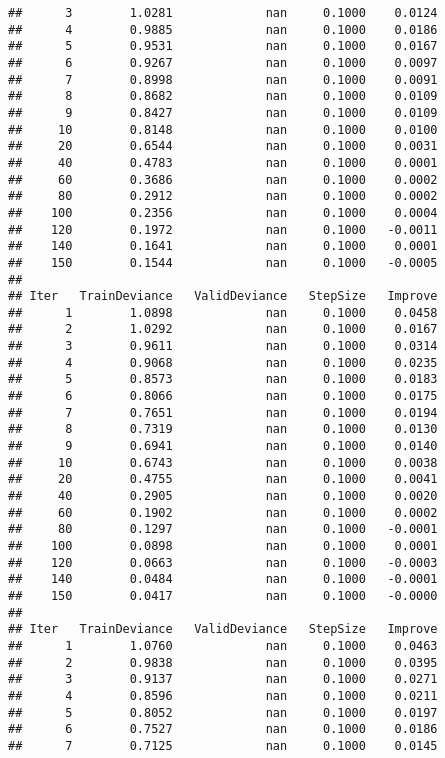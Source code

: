 \documentclass[]{article}
\begin{document}
\begin{verbatim}
##      3        1.0281             nan     0.1000    0.0124
##      4        0.9885             nan     0.1000    0.0186
##      5        0.9531             nan     0.1000    0.0167
##      6        0.9267             nan     0.1000    0.0097
##      7        0.8998             nan     0.1000    0.0091
##      8        0.8682             nan     0.1000    0.0109
##      9        0.8427             nan     0.1000    0.0109
##     10        0.8148             nan     0.1000    0.0100
##     20        0.6544             nan     0.1000    0.0031
##     40        0.4783             nan     0.1000    0.0001
##     60        0.3686             nan     0.1000    0.0002
##     80        0.2912             nan     0.1000    0.0002
##    100        0.2356             nan     0.1000    0.0004
##    120        0.1972             nan     0.1000   -0.0011
##    140        0.1641             nan     0.1000    0.0001
##    150        0.1544             nan     0.1000   -0.0005
## 
## Iter   TrainDeviance   ValidDeviance   StepSize   Improve
##      1        1.0898             nan     0.1000    0.0458
##      2        1.0292             nan     0.1000    0.0167
##      3        0.9611             nan     0.1000    0.0314
##      4        0.9068             nan     0.1000    0.0235
##      5        0.8573             nan     0.1000    0.0183
##      6        0.8066             nan     0.1000    0.0175
##      7        0.7651             nan     0.1000    0.0194
##      8        0.7319             nan     0.1000    0.0130
##      9        0.6941             nan     0.1000    0.0140
##     10        0.6743             nan     0.1000    0.0038
##     20        0.4755             nan     0.1000    0.0041
##     40        0.2905             nan     0.1000    0.0020
##     60        0.1902             nan     0.1000    0.0002
##     80        0.1297             nan     0.1000   -0.0001
##    100        0.0898             nan     0.1000    0.0001
##    120        0.0663             nan     0.1000   -0.0003
##    140        0.0484             nan     0.1000   -0.0001
##    150        0.0417             nan     0.1000   -0.0000
## 
## Iter   TrainDeviance   ValidDeviance   StepSize   Improve
##      1        1.0760             nan     0.1000    0.0463
##      2        0.9838             nan     0.1000    0.0395
##      3        0.9137             nan     0.1000    0.0271
##      4        0.8596             nan     0.1000    0.0211
##      5        0.8052             nan     0.1000    0.0197
##      6        0.7527             nan     0.1000    0.0186
##      7        0.7125             nan     0.1000    0.0145

\end{verbatim}
\end{document}

